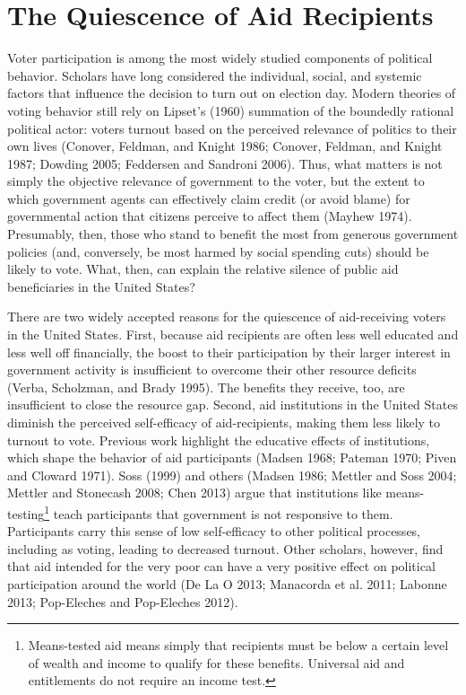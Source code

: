 \documentclass[12pt]{paper}
\begin{document}
\section{The Quiescence of Aid Recipients}
Voter participation is among the most widely studied components of political behavior. Scholars have long considered the individual, social, and systemic factors that influence the decision to turn out on election day. Modern theories of voting behavior still rely on Lipset’s (1960) summation of the boundedly rational political actor: voters turnout based on the perceived relevance of politics to their own lives (Conover, Feldman, and Knight 1986; Conover, Feldman, and Knight 1987; Dowding 2005; Feddersen and Sandroni 2006). Thus, what matters is not simply the objective relevance of government to the voter, but the extent to which government agents can effectively claim credit (or avoid blame) for governmental action that citizens perceive to affect them (Mayhew 1974). Presumably, then, those who stand to benefit the most from generous government policies (and, conversely, be most harmed by social spending cuts) should be likely to vote. What, then, can explain the relative silence of public aid beneficiaries in the United States?

There are two widely accepted reasons for the quiescence of aid-receiving voters in the United States. First, because aid recipients are often less well educated and less well off financially, the boost to their participation by their larger interest in government activity is insufficient to overcome their other resource deficits (Verba, Scholzman, and Brady 1995). The benefits they receive, too, are insufficient to close the resource gap. Second, aid institutions in the United States diminish the perceived self-efficacy of aid-recipients, making them less likely to turnout to vote. Previous work highlight the educative effects of institutions, which shape the behavior of aid participants (Madsen 1968; Pateman 1970; Piven and Cloward 1971). Soss (1999) and others (Madsen 1986; Mettler and Soss 2004; Mettler and Stonecash 2008; Chen 2013) argue that institutions like means-testing\footnote{Means-tested aid means simply that recipients must be below a certain level of wealth and income to qualify for these benefits. Universal aid and entitlements do not require an income test.} teach participants that government is not responsive to them. Participants carry this sense of low self-efficacy to other political processes, including as voting, leading to decreased turnout. Other scholars, however, find that aid intended for the very poor can have a very positive effect on political participation around the world (De La O 2013; Manacorda et al. 2011; Labonne 2013; Pop-Eleches and Pop-Eleches 2012).
\end{document}
